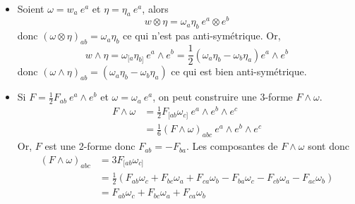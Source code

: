 \documentclass[a4paper,11pt]{report}
\begin{document}
            \begin{exmp}${}$\\
            \begin{itemize}[label = \textbullet]
                \item Soient $\omega = w_a ~e^a$ et $\eta = \eta_a ~e^a$, alors
                    \begin{equation}
                        w\otimes\eta = \omega_a\eta_b~ e^a\otimes e^b
                    \end{equation}
                    donc $(\omega\otimes\eta)_{ab} =\omega_a\eta_b$ ce qui n'est pas anti-symétrique. Or,
                    \begin{equation}
                        w\wedge\eta = \omega_{[a}\eta_{b]}~e^a\wedge e^b = \frac{1}{2}(\omega_a \eta_b-\omega_b\eta_a)e^a\wedge e^b
                    \end{equation}
                    donc $(\omega\wedge\eta)_{ab} =(\omega_a\eta_b-\omega_b\eta_a)$ ce qui est bien anti-symétrique.
                \item Si $F = \frac{1}{2} F_{ab}~e^a\wedge e^b$ et $\omega = \omega_a~ e^a$, on peut construire une 3-forme $F\wedge\omega$.
                \begin{align}
                    F\wedge\omega &= \frac{1}{2}F_{[ab}\omega_{c]}~e^a\wedge e^b \wedge e^c\\
                    &= \frac{1}{6}(F\wedge\omega)_{abc}~e^a\wedge e^b \wedge e^c
                \end{align}
                Or, $F$ est une 2-forme donc $F_{ab} = -F_{ba}$. Les composantes de $F\wedge\omega$ sont donc
                \begin{align}
                    (F\wedge\omega)_{abc} &= 3 F_{[ab}\omega_{c]}\\
                    &= \frac{1}{2}\left(F_{ab}\omega_c+F_{bc}\omega_a+F_{ca}\omega_b-F_{ba}\omega_c-F_{cb}\omega_a-F_{ac}\omega_b\right)\\
                    &= F_{ab}\omega_c+F_{bc}\omega_a+F_{ca}\omega_b
                \end{align}
            \end{itemize}
            \end{exmp}
            
\end{document}
